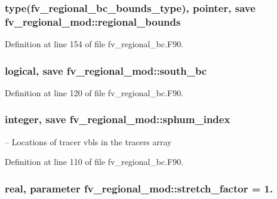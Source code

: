 \subsubsection[{regional\-\_\-bounds}]{\setlength{\rightskip}{0pt plus 5cm}type(fv\-\_\-regional\-\_\-bc\-\_\-bounds\-\_\-type), pointer, save fv\-\_\-regional\-\_\-mod\-::regional\-\_\-bounds\hspace{0.3cm}{\ttfamily [private]}}\label{classfv__regional__mod_a13909d8a60906605379b221f840ea3c1}


Definition at line 154 of file fv\-\_\-regional\-\_\-bc.\-F90.

\subsubsection[{south\-\_\-bc}]{\setlength{\rightskip}{0pt plus 5cm}logical, save fv\-\_\-regional\-\_\-mod\-::south\-\_\-bc\hspace{0.3cm}{\ttfamily [private]}}\label{classfv__regional__mod_aa19455811e08a60979cfe82e9339cf79}


Definition at line 120 of file fv\-\_\-regional\-\_\-bc.\-F90.

\subsubsection[{sphum\-\_\-index}]{\setlength{\rightskip}{0pt plus 5cm}integer, save fv\-\_\-regional\-\_\-mod\-::sphum\-\_\-index\hspace{0.3cm}{\ttfamily [private]}}\label{classfv__regional__mod_a5046c418bb3714689df7737b3024d910}


-- Locations of tracer vbls in the tracers array 



Definition at line 110 of file fv\-\_\-regional\-\_\-bc.\-F90.

\subsubsection[{stretch\-\_\-factor}]{\setlength{\rightskip}{0pt plus 5cm}real, parameter fv\-\_\-regional\-\_\-mod\-::stretch\-\_\-factor = 1.\hspace{0.3cm}{\ttfamily [private]}}\label{classfv__regional__mod_ac8743a9351000e8f9867442d74f27deb}


